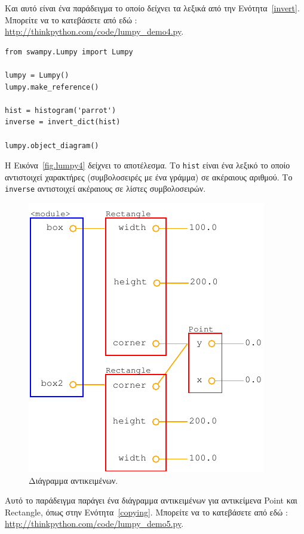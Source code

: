 \documentclass[10pt]{book}
\begin{document}
Και αυτό είναι ένα παράδειγμα το οποίο δείχνει τα λεξικά από την Ενότητα~\ref{invert}.  Μπορείτε να το κατεβάσετε από εδώ : 
\url{http://thinkpython.com/code/lumpy_demo4.py}.

\begin{verbatim}
from swampy.Lumpy import Lumpy

lumpy = Lumpy()
lumpy.make_reference()

hist = histogram('parrot')
inverse = invert_dict(hist)

lumpy.object_diagram()
\end{verbatim}

 Η Εικόνα~\ref{fig.lumpy4} δείχνει το αποτέλεσμα.  Το  {\tt hist}  είναι ένα λεξικό το οποίο αντιστοιχεί χαρακτήρες (συμβολοσειρές με ένα γράμμα) σε ακέραιους αριθμού.  Το  {\tt inverse}  αντιστοιχεί ακέραιους σε λίστες συμβολοσειρών.

\begin{figure}
\centerline
{\includegraphics[scale=0.7]{figs/lumpydemo5.pdf}}
\caption{Διάγραμμα αντικειμένων.}
\label{fig.lumpy5}
\end{figure}

Αυτό το παράδειγμα παράγει ένα διάγραμμα αντικειμένων για αντικείμενα  Point  και  Rectangle,  όπως στην Ενότητα~\ref{copying}.  Μπορείτε να το κατεβάσετε από εδώ : \url{http://thinkpython.com/code/lumpy_demo5.py}.
\end{document}
